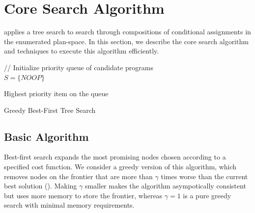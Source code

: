 \section{Core Search Algorithm}\label{s:search}
\sys applies a tree search to search through compositions of conditional assignments in the enumerated plan-space. In this section, we describe the core search algorithm and techniques to execute this algorithm efficiently.

{
\begin{algorithm}[t]

// Initialize priority queue of candidate programs\\
$S = \{NOOP\}$



\Return Highest priority item on the queue
\caption{Greedy Best-First Tree Search}
\label{alg:main}
\end{algorithm}
}

\subsection{Basic Algorithm}
Best-first search expands the most promising nodes chosen according to a specified cost function.
We consider a greedy version of this algorithm, which removes nodes on the frontier that are more than $\gamma$ times worse than the current best solution ().
Making $\gamma$ smaller makes the algorithm asympotically consistent but uses more memory to store the frontier, whereas $\gamma=1$ is a pure greedy search with minimal memory requirements.  

